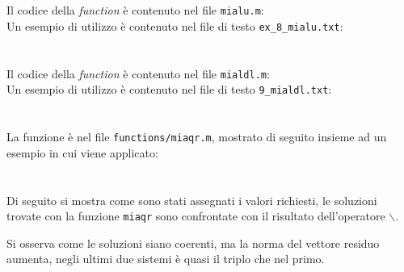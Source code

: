 \documentclass[10pt,a4paper]{article}
\begin{document}
\section{}
Il codice della \textit{function} è contenuto nel file \texttt{mialu.m}:\\
Un esempio di utilizzo è contenuto nel file di testo \texttt{ex\_8\_mialu.txt}:

\section{}
Il codice della \textit{function} è contenuto nel file \texttt{mialdl.m}:\\
Un esempio di utilizzo è contenuto nel file di testo \texttt{9\_mialdl.txt}:
\section{}
La funzione è nel file \texttt{functions/miaqr.m}, mostrato di seguito insieme ad un esempio in cui viene applicato:


\section{}
\section{}
\section{}
Di seguito si mostra come sono stati assegnati i valori richiesti, le soluzioni trovate con la funzione \texttt{miaqr} sono confrontate con il risultato dell'operatore \texttt{$\backslash$}.

Si osserva come le soluzioni siano coerenti, ma la norma del vettore residuo aumenta, negli ultimi due sistemi è quasi il triplo che nel primo.\\
\section{}
\end{document}
